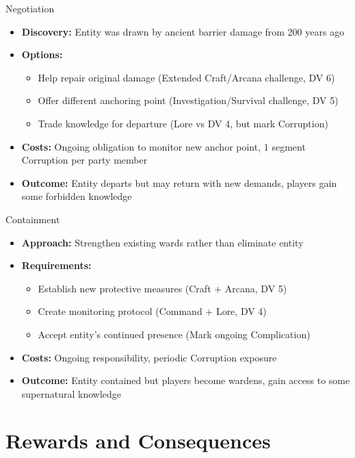 \documentclass[11pt]{article}
\begin{document}
\begin{mechanicsbox}{Negotiation}
\begin{itemize}
    \item \textbf{Discovery:} Entity was drawn by ancient barrier damage from 200 years ago
    \item \textbf{Options:}
    \begin{itemize}
        \item Help repair original damage (Extended Craft/Arcana challenge, DV 6)
        \item Offer different anchoring point (Investigation/Survival challenge, DV 5)
        \item Trade knowledge for departure (Lore vs DV 4, but mark Corruption)
    \end{itemize}
    \item \textbf{Costs:} Ongoing obligation to monitor new anchor point, 1 segment Corruption per party member
    \item \textbf{Outcome:} Entity departs but may return with new demands, players gain some forbidden knowledge
\end{itemize}
\end{mechanicsbox}

\begin{mechanicsbox}{Containment}
\begin{itemize}
    \item \textbf{Approach:} Strengthen existing wards rather than eliminate entity
    \item \textbf{Requirements:}
    \begin{itemize}
        \item Establish new protective measures (Craft + Arcana, DV 5)
        \item Create monitoring protocol (Command + Lore, DV 4)
        \item Accept entity's continued presence (Mark ongoing Complication)
    \end{itemize}
    \item \textbf{Costs:} Ongoing responsibility, periodic Corruption exposure
    \item \textbf{Outcome:} Entity contained but players become wardens, gain access to some supernatural knowledge
\end{itemize}
\end{mechanicsbox}

\section*{Rewards and Consequences}
\end{document}

